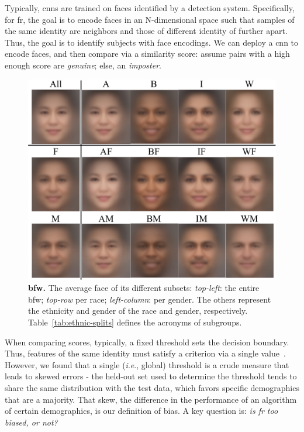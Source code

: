 \documentclass[10pt,twocolumn,letterpaper]{article}
\newcommand{\ie}{\textit{i}.\textit{e}., }
\begin{document}
    Typically, \glspl{cnn} are trained on faces identified by a detection system. Specifically, for \gls{fr}, the goal is to encode faces in an N-dimensional space such that samples of the same identity are neighbors and those of different identity of further apart. Thus, the goal is to identify subjects with face encodings. We can deploy a \gls{cnn} to encode faces, and then compare via a similarity score: assume pairs with a high enough score are \emph{genuine}; else, an \emph{imposter}. 

    \begin{figure}[t!]
        \centering
        \includegraphics[width=.9\linewidth]{figures/montage.pdf}
        \caption{\textbf{\gls{bfw}.} The average face of its different subsets: \emph{top-left}: the entire \gls{bfw}; \emph{top-row} per race;  \emph{left-column}: per gender. The others represent the ethnicity and gender of the race and gender, respectively. Table~\ref{tab:ethnic-splits} defines the acronyms of subgroups.}
        \label{fig:avg-faces}
    \end{figure}
    
    When comparing scores, typically, a fixed threshold sets the decision boundary. Thus, features of the same identity must satisfy a criterion via a single value~\cite{deng2019arcface, liu2017sphereface, wang2018additive, wang2018cosface}. However, we found that a single (\ie global) threshold is a crude measure that leads to skewed errors - the held-out set used to determine the threshold tends to share the same distribution with the test data, which favors specific demographics that are a majority. That skew, the difference in the performance of an algorithm of certain demographics, is our definition of bias. A key question is: \emph{is \gls{fr} too biased, or not?} 
    
\end{document}
